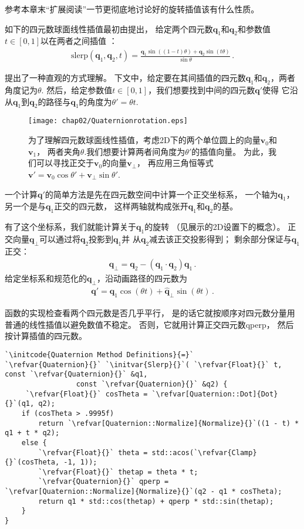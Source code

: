 参考本章末“扩展阅读”一节更彻底地讨论好的旋转插值该有什么性质。

如下的四元数球面线性插值最初由\citet{10.1145/325334.325242}提出，
给定两个四元数$\bm q_1$和$\bm q_2$和参数值$t\in[0,1]$以在两者之间插值
：
\begin{align*}
    \mathrm{slerp}(\bm q_1,\bm q_2,t)=\frac{\bm q_1\sin((1-t)\theta)+\bm q_2\sin(t\theta)}{\sin\theta}\, .
\end{align*}

\citet{Blow_2004}提出了一种直观的方式理解。
下文中，给定要在其间插值的四元数$\bm q_1$和$\bm q_2$，两者角度记为$\theta$.
然后，给定参数值$t\in[0,1]$，我们想要找到中间的四元数$\bm q'$使得
它沿从$\bm q_1$到$\bm q_2$的路径与$\bm q_1$的角度为$\theta'=\theta t$.

\begin{figure}[htbp]
    \centering\texttt{[image: chap02/Quaternionrotation.eps]}
    \caption{为了理解四元数球面线性插值，考虑2D下的两个单位圆上的向量$\bm v_0$和$\bm v_1$，
        两者夹角$\theta$.我们想要计算两者间角度为$\theta'$的插值向量。
        为此，我们可以寻找正交于$\bm v_0$的向量$\bm v_{\perp}$，
        再应用三角恒等式$\bm v'=\bm v_0\cos\theta'+\bm v_{\perp}\sin\theta'$.}
    \label{fig:2.17}
\end{figure}

一个计算$\bm q'$的简单方法是先在四元数空间中计算一个正交坐标系，
一个轴为$\bm q_1$，另一个是与$\bm q_1$正交的四元数，
这样两轴就构成张开$\bm q_1$和$\bm q_2$的基。

有了这个坐标系，我们就能计算关于$\bm q_1$的旋转
（见展示的2D设置下的概念）。
正交向量$\bm q_{\perp}$可以通过将$\bm q_2$投影到$\bm q_1$并
从$\bm q_2$减去该正交投影得到；
剩余部分保证与$\bm q_1$正交：
\begin{align}\label{eq:2.7}
    \bm q_{\perp}=\bm q_2-(\bm q_1\cdot\bm q_2)\bm q_1\, .
\end{align}
给定坐标系和规范化的$\bm q_{\perp}$，沿动画路径的四元数为
\begin{align}\label{eq:2.8}
    \bm q'=\bm q_1\cos(\theta t)+\hat{\bm q}_{\perp}\sin(\theta t)\, .
\end{align}

函数的实现检查看两个四元数是否几乎平行，
是的话它就按顺序对四元数分量用普通的线性插值以避免数值不稳定。
否则，它就用计算正交四元数{\ttfamily qperp}，
然后按计算插值的四元数。
\begin{lstlisting}
`\initcode{Quaternion Method Definitions}{=}`
`\refvar{Quaternion}{}` `\initvar{Slerp}{}`( `\refvar{Float}{}` t, const `\refvar{Quaternion}{}` &q1,
                 const `\refvar{Quaternion}{}` &q2) {
     `\refvar{Float}{}` cosTheta = `\refvar[Quaternion::Dot]{Dot}{}`(q1, q2);
    if (cosTheta > .9995f)
        return `\refvar[Quaternion::Normalize]{Normalize}{}`((1 - t) * q1 + t * q2);
    else {
        `\refvar{Float}{}` theta = std::acos(`\refvar{Clamp}{}`(cosTheta, -1, 1));
        `\refvar{Float}{}` thetap = theta * t;
        `\refvar{Quaternion}{}` qperp = `\refvar[Quaternion::Normalize]{Normalize}{}`(q2 - q1 * cosTheta);
        return q1 * std::cos(thetap) + qperp * std::sin(thetap);
    }
}
\end{lstlisting}

